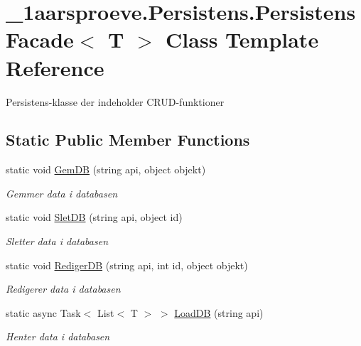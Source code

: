 \hypertarget{class__1aarsproeve_1_1_persistens_1_1_persistens_facade}{}\section{\+\_\+1aarsproeve.\+Persistens.\+Persistens\+Facade$<$ T $>$ Class Template Reference}
\label{class__1aarsproeve_1_1_persistens_1_1_persistens_facade}


Persistens-\/klasse der indeholder C\+R\+U\+D-\/funktioner  


\subsection*{Static Public Member Functions}
\begin{DoxyCompactItemize}
\item 
static void \hyperlink{class__1aarsproeve_1_1_persistens_1_1_persistens_facade_a58be4f9dca4d750397b687f82a75b242}{Gem\+D\+B} (string api, object objekt)
\begin{DoxyCompactList}\small\item\em Gemmer data i databasen \end{DoxyCompactList}\item 
static void \hyperlink{class__1aarsproeve_1_1_persistens_1_1_persistens_facade_a774ffeccb48cea0195fb2f42a9612e67}{Slet\+D\+B} (string api, object id)
\begin{DoxyCompactList}\small\item\em Sletter data i databasen \end{DoxyCompactList}\item 
static void \hyperlink{class__1aarsproeve_1_1_persistens_1_1_persistens_facade_abf4034a829e5a233ef61fa7315220a98}{Rediger\+D\+B} (string api, int id, object objekt)
\begin{DoxyCompactList}\small\item\em Redigerer data i databasen \end{DoxyCompactList}\item 
static async Task$<$ List$<$ T $>$ $>$ \hyperlink{class__1aarsproeve_1_1_persistens_1_1_persistens_facade_a282e4349d842d409431aebceaa12f978}{Load\+D\+B} (string api)
\begin{DoxyCompactList}\small\item\em Henter data i databasen \end{DoxyCompactList}\end{DoxyCompactItemize}


